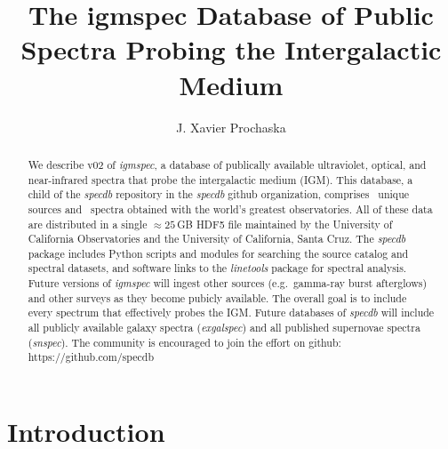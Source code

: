 \documentclass[12pt]{elsarticle}
\begin{document}
\begin{frontmatter}

\title{The igmspec Database of Public Spectra Probing
the Intergalactic Medium}

\author{
J. Xavier Prochaska}%
\address{
Department of Astronomy and Astrophysics, UCO/Lick Observatory, University of California, 1156 High Street, Santa Cruz, CA 95064}

\begin{abstract}
We describe v02 of {\it igmspec}, a database of publically
available ultraviolet, optical, and near-infrared spectra 
that probe the intergalactic medium (IGM).  This database, a child
of the {\it specdb} repository in the {\it specdb} github organization, 
comprises \nsource~unique
sources and \nspectra~spectra obtained with the world's greatest
observatories.  All of these data are distributed in a single
$\approx 25$\,GB HDF5 file maintained by the University of
California Observatories and the University of California,
Santa Cruz.  The {\it specdb} package includes
Python scripts and modules for searching the source catalog
and spectral datasets, and software links to the {\it linetools}
package for spectral analysis.
Future versions of {\it igmspec} will ingest other sources
(e.g.\ gamma-ray burst afterglows) and other surveys as they become
pubicly available.  
The overall goal is to include every 
spectrum that effectively probes the IGM.  
Future databases of {\it specdb}
will include 
all publicly available galaxy spectra 
({\it exgalspec}) and 
all published supernovae spectra ({\it snspec}). 
The community is encouraged to join the effort on github:
https://github.com/specdb
\end{abstract}

\end{frontmatter}


\section{Introduction}
\label{sec:intro}
\end{document}

